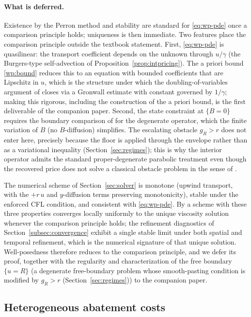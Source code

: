\documentclass[11pt,letterpaper]{article}
\theoremstyle{plain}
\theoremstyle{definition}
\numberwithin{equation}{section}
\begin{document}
\paragraph{What is deferred.}
Existence by the Perron method and stability are standard for \eqref{eq:wp-pde} once a comparison principle holds; uniqueness is then immediate. Two features place the comparison principle outside the textbook statement. First, \eqref{eq:wp-pde} is quasilinear: the transport coefficient depends on the unknown through $u/\gamma$ (the Burgers-type self-advection of Proposition~\ref{prop:intpricing}). The a priori bound \ref{wp:bound} reduces this to an equation with bounded coefficients that are Lipschitz in $u$, which is the structure under which the doubling-of-variables argument of \citet{crandall1992} closes via a Gron\-wall estimate with constant governed by $1/\gamma$; making this rigorous, including the construction of the a priori bound, is the first deliverable of the companion paper. Second, the state constraint at $\{B=0\}$ requires the boundary comparison of \citet{soner1986} for the degenerate operator, which the finite variation of $B$ (no $B$-diffusion) simplifies. The escalating obstacle $g_R>r$ does not enter here, precisely because the floor is applied through the envelope rather than as a variational inequality (Section~\ref{sec:regimes}); this is why the interior operator admits the standard proper-degenerate parabolic treatment even though the recovered price does not solve a classical obstacle problem in the sense of \citet{bensoussan1982}.

The numerical scheme of Section~\ref{sec:solver} is monotone (upwind transport, with the
$+r\,u$ and $y$-diffusion terms preserving monotonicity), stable under the enforced CFL condition,
and consistent with \eqref{eq:wp-pde}. By \citet{barles1991} a scheme with these three properties
converges locally uniformly to the unique viscosity solution whenever the comparison
principle holds; the refinement diagnostics of Section~\ref{subsec:convergence} exhibit a single
stable limit under both spatial and temporal refinement, which is the numerical signature of that
unique solution. Well-posedness therefore reduces to the comparison principle, and we defer its
proof, together with the regularity and characterization of the free boundary $\{u=R\}$ (a
degenerate free-boundary problem whose smooth-pasting condition is modified by $g_R>r$
(Section~\ref{sec:regimes})) to the companion paper.

\subsection{Heterogeneous abatement costs}\label{subsec:hetmac}
\end{document}
